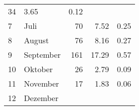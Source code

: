 \begin{longtable}{lXrrr}
       \num{34} &
       \num[round-mode=places,round-precision=2]{3.65} &
         \num[round-mode=places,round-precision=2]{0.12} \\

     7 &
     \multicolumn{1}{X}{ Juli   } &


       \num{70} &
       \num[round-mode=places,round-precision=2]{7.52} &
         \num[round-mode=places,round-precision=2]{0.25} \\

     8 &
     \multicolumn{1}{X}{ August   } &


       \num{76} &
       \num[round-mode=places,round-precision=2]{8.16} &
         \num[round-mode=places,round-precision=2]{0.27} \\

     9 &
     \multicolumn{1}{X}{ September   } &


       \num{161} &
       \num[round-mode=places,round-precision=2]{17.29} &
         \num[round-mode=places,round-precision=2]{0.57} \\

     10 &
     \multicolumn{1}{X}{ Oktober   } &


       \num{26} &
       \num[round-mode=places,round-precision=2]{2.79} &
         \num[round-mode=places,round-precision=2]{0.09} \\

     11 &
     \multicolumn{1}{X}{ November   } &


       \num{17} &
       \num[round-mode=places,round-precision=2]{1.83} &
         \num[round-mode=places,round-precision=2]{0.06} \\

     12 &
     \multicolumn{1}{X}{ Dezember   } &



\end{longtable}

